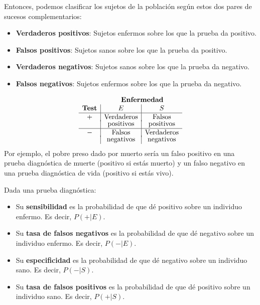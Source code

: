 \documentclass[
]{book}
\theoremstyle{definition}
\theoremstyle{definition}
\theoremstyle{definition}
\theoremstyle{definition}
\theoremstyle{remark}
\begin{document}
Entonces, podemos clasificar los sujetos de la población según estos dos pares de sucesos complementarios:

\begin{itemize}
\item
  \textbf{Verdaderos positivos}: Sujetos enfermos sobre los que la prueba da positivo.
\item
  \textbf{Falsos positivos}: Sujetos sanos sobre los que la prueba da positivo.
\item
  \textbf{Verdaderos negativos}: Sujetos sanos sobre los que la prueba da negativo.
\item
  \textbf{Falsos negativos}: Sujetos enfermos sobre los que la prueba da negativo.
\end{itemize}

\[
\begin{array}{l}
\hphantom{TestTestTest}\textbf{Enfermedad} \\
\begin{array}{c|c|c}
\textbf{Test}  & E & S \\ \hline
+ & \text{Verdaderos} & \text{Falsos} \\[-0.5ex]    
 & \text{positivos} & \text{positivos} \\ \hline
- & \text{Falsos} & \text{Verdaderos} \\[-0.5ex]    
 & \text{negativos} & \text{negativos}
\end{array}
\end{array}
\]
Por ejemplo, el pobre preso dado por muerto sería un falso positivo en una prueba diagnóstica de muerte (positivo si estás muerto) y un falso negativo en una prueba diagnóstica de vida (positivo si estás vivo).

Dada una prueba diagnóstica:

\begin{itemize}
\item
  Su \textbf{sensibilidad} es la probabilidad de que dé positivo sobre un individuo enfermo. Es decir, \(P(+|E)\).
\item
  Su \textbf{tasa de falsos negativos} es la probabilidad de que dé negativo sobre un individuo enfermo. Es decir, \(P(-|E)\).
\item
  Su \textbf{especificidad} es la probabilidad de que dé negativo sobre un individuo sano. Es decir, \(P(-|S)\).
\item
  Su \textbf{tasa de falsos positivos} es la probabilidad de que dé positivo sobre un individuo sano. Es decir, \(P(+|S)\).
\end{itemize}
\end{document}
